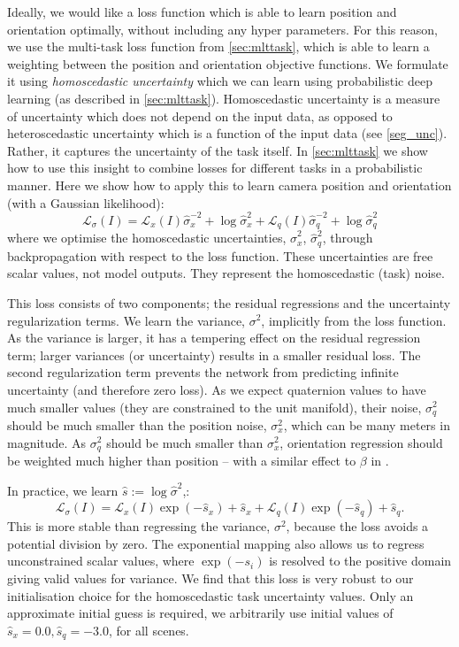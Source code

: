 Ideally, we would like a loss function which is able to learn position and orientation optimally, without including any hyper parameters. For this reason, we use the multi-task loss function from \cref{sec:mlttask}, which is able to learn a weighting between the position and orientation objective functions. We formulate it using \textit{homoscedastic uncertainty} which we can learn using probabilistic deep learning (as described in \cref{sec:mlttask}). Homoscedastic uncertainty is a measure of uncertainty which does not depend on the input data, as opposed to heteroscedastic uncertainty which is a function of the input data (see \cref{seg_unc}). Rather, it captures the uncertainty of the task itself. In \cref{sec:mlttask} we show how to use this insight to combine losses for different tasks in a probabilistic manner. Here we show how to apply this to learn camera position and orientation (with a Gaussian likelihood):
\begin{equation}
\label{eqn:loss4}
\mathcal{L}_{\sigma}(I) = \mathcal{L}_x(I) \hat{\sigma}_x^{-2} + \log{\hat{\sigma}_x^2} + \mathcal{L}_{q}(I) \hat{\sigma}_q^{-2} + \log{\hat{\sigma}_q^2}
\end{equation}
where we optimise the homoscedastic uncertainties, $\hat{\sigma}_x^2$, $\hat{\sigma}_q^2$, through backpropagation with respect to the loss function. These uncertainties are free scalar values, not model outputs. They represent the homoscedastic (task) noise.

This loss consists of two components; the residual regressions and the uncertainty regularization terms. We learn the variance, $\sigma^2$, implicitly from the loss function. As the variance is larger, it has a tempering effect on the residual regression term; larger variances (or uncertainty) results in a smaller residual loss. The second regularization term prevents the network from predicting infinite uncertainty (and therefore zero loss). As we expect quaternion values to have much smaller values (they are constrained to the unit manifold), their noise, $\sigma_q^2$ should be much smaller than the position noise, $\sigma_x^2$, which can be many meters in magnitude. As $\sigma_q^2$ should be much smaller than $\sigma_x^2$, orientation regression should be weighted much higher than position -- with a similar effect to $\beta$ in .

In practice, we learn $\hat{s}:=\log\hat{\sigma}^2$,:
\begin{equation}
\label{eqn:loss5}
\mathcal{L}_{\sigma}(I) = \mathcal{L}_x(I) \exp (-\hat{s}_x) + \hat{s}_x + \mathcal{L}_{q}(I) \exp (-\hat{s}_q) + \hat{s}_q.
\end{equation}
This is more stable than regressing the variance, $\sigma^2$, because the loss avoids a potential division by zero. The exponential mapping also allows us to regress unconstrained scalar values, where $\exp(-s_i)$ is resolved to the positive domain giving valid values for variance. We find that this loss is very robust to our initialisation choice for the homoscedastic task uncertainty values. Only an approximate initial guess is required, we arbitrarily use initial values of $\hat{s}_x=0.0, \hat{s}_q=-3.0$, for all scenes.

